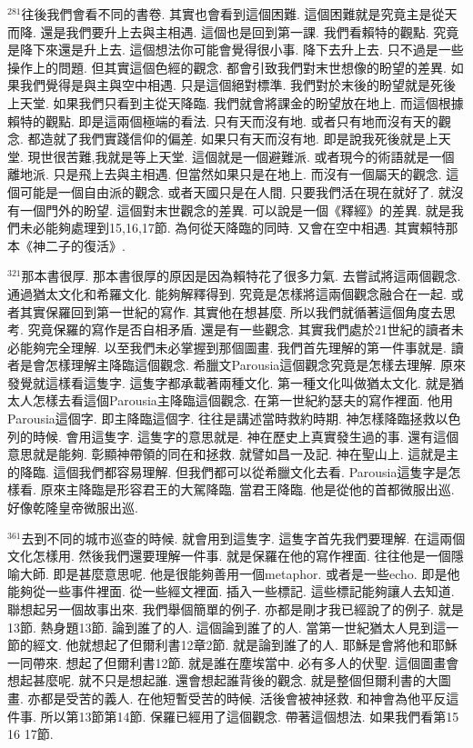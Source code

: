 \documentclass{book}
\begin{document}
$^{281}$往後我們會看不同的書卷.
其實也會看到這個困難.
這個困難就是究竟主是從天而降.
還是我們要升上去與主相遇.
這個也是回到第一課.
我們看賴特的觀點.
究竟是降下來還是升上去.
這個想法你可能會覺得很小事.
降下去升上去.
只不過是一些操作上的問題.
但其實這個色經的觀念.
都會引致我們對末世想像的盼望的差異.
如果我們覺得是與主與空中相遇.
只是這個絕對標準.
我們對於末後的盼望就是死後上天堂.
如果我們只看到主從天降臨.
我們就會將課金的盼望放在地上.
而這個根據賴特的觀點.
即是這兩個極端的看法.
只有天而沒有地.
或者只有地而沒有天的觀念.
都造就了我們實踐信仰的偏差.
如果只有天而沒有地.
即是說我死後就是上天堂.
現世很苦難,我就是等上天堂.
這個就是一個避難派.
或者現今的術語就是一個離地派.
只是飛上去與主相遇.
但當然如果只是在地上.
而沒有一個屬天的觀念.
這個可能是一個自由派的觀念.
或者天國只是在人間.
只要我們活在現在就好了.
就沒有一個門外的盼望.
這個對末世觀念的差異.
可以說是一個《釋經》的差異.
就是我們未必能夠處理到15,16,17節.
為何從天降臨的同時.
又會在空中相遇.
其實賴特那本《神二子的復活》.

$^{321}$那本書很厚.
那本書很厚的原因是因為賴特花了很多力氣.
去嘗試將這兩個觀念.
通過猶太文化和希羅文化.
能夠解釋得到.
究竟是怎樣將這兩個觀念融合在一起.
或者其實保羅回到第一世紀的寫作.
其實他在想甚麼.
所以我們就循著這個角度去思考.
究竟保羅的寫作是否自相矛盾.
還是有一些觀念.
其實我們處於21世紀的讀者未必能夠完全理解.
以至我們未必掌握到那個圖畫.
我們首先理解的第一件事就是.
讀者是會怎樣理解主降臨這個觀念.
希臘文Parousia這個觀念究竟是怎樣去理解.
原來發覺就這樣看這隻字.
這隻字都承載著兩種文化.
第一種文化叫做猶太文化.
就是猶太人怎樣去看這個Parousia主降臨這個觀念.
在第一世紀約瑟夫的寫作裡面.
他用Parousia這個字.
即主降臨這個字.
往往是講述當時救約時期.
神怎樣降臨拯救以色列的時候.
會用這隻字.
這隻字的意思就是.
神在歷史上真實發生過的事.
還有這個意思就是能夠.
彰顯神帶領的同在和拯救.
就譬如昌一及記.
神在聖山上.
這就是主的降臨.
這個我們都容易理解.
但我們都可以從希臘文化去看.
Parousia這隻字是怎樣看.
原來主降臨是形容君王的大駕降臨.
當君王降臨.
他是從他的首都微服出巡.
好像乾隆皇帝微服出巡.

$^{361}$去到不同的城市巡查的時候.
就會用到這隻字.
這隻字首先我們要理解.
在這兩個文化怎樣用.
然後我們還要理解一件事.
就是保羅在他的寫作裡面.
往往他是一個隱喻大師.
即是甚麼意思呢.
他是很能夠善用一個metaphor.
或者是一些echo.
即是他能夠從一些事件裡面.
從一些經文裡面.
插入一些標記.
這些標記能夠讓人去知道.
聯想起另一個故事出來.
我們舉個簡單的例子.
亦都是剛才我已經說了的例子.
就是13節.
熱身題13節.
論到誰了的人.
這個論到誰了的人.
當第一世紀猶太人見到這一節的經文.
他就想起了但爾利書12章2節.
就是論到誰了的人.
耶穌是會將他和耶穌一同帶來.
想起了但爾利書12節.
就是誰在塵埃當中.
必有多人的伏聖.
這個圖畫會想起甚麼呢.
就不只是想起誰.
還會想起誰背後的觀念.
就是整個但爾利書的大圖畫.
亦都是受苦的義人.
在他短暫受苦的時候.
活後會被神拯救.
和神會為他平反這件事.
所以第13節第14節.
保羅已經用了這個觀念.
帶著這個想法.
如果我們看第15 16 17節.
\end{document}
